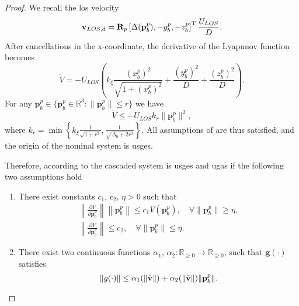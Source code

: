 \begin{proof}
    We recall the \gls{los} velocity
    \begin{equation}
        \mathbf{v}_{LOS,d} = \mathbf{R}_p \left[ \Delta(\mathbf{p}_b^p), -y_b^p, -z_b^p \right]^{\rm T} \frac{U_{LOS}}{D}.
    \end{equation}
    After cancellations in the x-coordinate, the derivative of the Lyapunov function becomes
    \begin{equation}
        \dot{V} = -U_{LOS}\left( k_\xi \frac{(x_b^p)^2}{\sqrt{1 + (x_b^p)^2}} + \frac{(y_b^p)^2}{D} + \frac{(z_b^p)^2}{D}\right ).
    \end{equation}
    For any $\mathbf{p}_b^p \in \{\mathbf{p}_b^p \in \mathbb{R}^3: \| \mathbf{p}_b^p \| \leq r\}$ we have
    \begin{equation}
        \dot{V} \leq - U_{LOS} k_r \| \mathbf{p}_b^p\|^2,
    \end{equation}
    where $k_r = \min \left\{k_\xi \frac{1}{\sqrt{1 + r^2}}, \frac{1}{\sqrt{\Delta_0 + 2r^2}}\right\}$. All assumptions of \cite[Theorem 5]{pettersen_lyapunov_2017} are thus satisfied, and the origin of the nominal system is \gls{usges}.

    Therefore, according to \cite[Proposition 9]{pettersen_lyapunov_2017} the cascaded system is \gls{usges} and \gls{ugas} if the following two assumptions hold

    \begin{enumerate}
    \item  There exist constants $c_1,\, c_2,\, \eta > 0$ such that
    \begin{gather}
        \left \| \frac{\partial V}{\partial \mathbf{p}_b^p}\right \| \left \|\mathbf{p}_b^p \right \| \leq c_1 V(\mathbf{p}_b^p), \quad \forall \|\mathbf{p}_b^p\| \geq \eta,\\
        \left \| \frac{\partial V}{\partial \mathbf{p}_b^p}\right \| \leq c_2, \quad \forall \|\mathbf{p}_b^p\| \leq \eta.
    \end{gather}\label{assumption:cascaded_one}

\item \label{assumption:cascaded_two}
    There exist two continuous functions $\alpha_1, \, \alpha_2 : \mathbb{R}_{\geq0} \rightarrow \mathbb{R}_{\geq0}$, such that $\mathbf{g}(\cdot)$ satisfies
    \begin{equation}\label{eq:cascaded_assumption_two}
        \|g(\cdot)\| \leq \alpha_1(\|\Tilde{\mathbf{v}}\|) + \alpha_2(\|\Tilde{\mathbf{v}}\|)\|\mathbf{p}_b^p\|.
    \end{equation}
\end{enumerate}


\end{proof}
